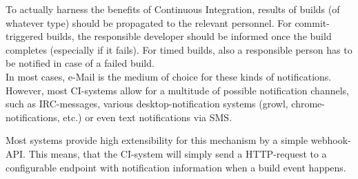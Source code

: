 To actually harness the benefits of Continuous Integration, results of builds
(of whatever type) should be propagated to the relevant personnel. For
commit-triggered builds, the responsible developer should be informed once the
build completes (especially if it fails). For timed builds, also a responsible
person has to be notified in case of a failed build.\\

In most cases, e-Mail is the medium of choice for these kinds of notifications.
However, most CI-systems allow for a multitude of possible notification
channels, such as IRC-messages, various desktop-notification systems (growl,
chrome-notifications, etc.) or even text notifications via SMS.

Most systems provide high extensibility for this mechanism by a simple
webhook-API. This means, that the CI-system will simply send a HTTP-request to a
configurable endpoint with notification information when a build event happens.
